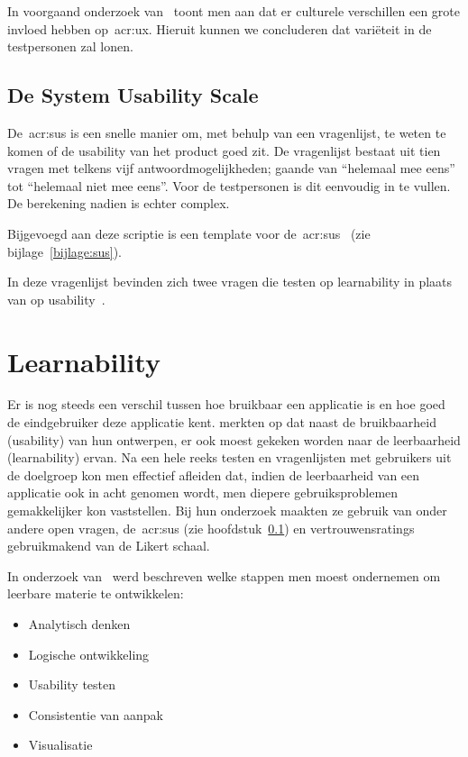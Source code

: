 In voorgaand onderzoek van~\textcite{Marcus2006} toont men aan dat er culturele verschillen een grote invloed hebben op~\acrshort{acr:ux}. Hieruit kunnen we concluderen dat variëteit in de testpersonen zal lonen.

\subsection{De System Usability Scale}
\label{sec:usability-testing:sus}

De~\acrlong{acr:sus} is een snelle manier om, met behulp van een vragenlijst, te weten te komen of de usability van het product goed zit. De vragenlijst bestaat uit tien vragen met telkens vijf antwoordmogelijkheden; gaande van ``helemaal mee eens'' tot ``helemaal niet mee eens''. Voor de testpersonen is dit eenvoudig in te vullen. De berekening nadien is echter complex.

Bijgevoegd aan deze scriptie is een template voor de~\acrlong{acr:sus}~\autocite{Calisto2018} (zie bijlage~\ref{bijlage:sus}).

In deze vragenlijst bevinden zich twee vragen die testen op learnability in plaats van op usability~\autocite{Lewis2009}.

\section{Learnability}
\label{sec:learnability}

Er is nog steeds een verschil tussen hoe bruikbaar een applicatie is en hoe goed de eindgebruiker deze applicatie kent. \textcite{Coyle2016} merkten op dat naast de bruikbaarheid (usability) van hun ontwerpen, er ook moest gekeken worden naar de leerbaarheid (learnability) ervan. Na een hele reeks testen en vragenlijsten met gebruikers uit de doelgroep kon men effectief afleiden dat, indien de leerbaarheid van een applicatie ook in acht genomen wordt, men diepere gebruiksproblemen gemakkelijker kon vaststellen. Bij hun onderzoek maakten ze gebruik van onder andere open vragen, de~\acrlong{acr:sus} (zie hoofdstuk~\ref{sec:usability-testing:sus}) en vertrouwensratings gebruikmakend van de Likert schaal.

In onderzoek van~\textcite{Haramundanis2001} werd beschreven welke stappen men moest ondernemen om leerbare materie te ontwikkelen:
\begin{itemize}
    \item Analytisch denken
    \item Logische ontwikkeling
    \item Usability testen
    \item Consistentie van aanpak
    \item Visualisatie
\end{itemize}

